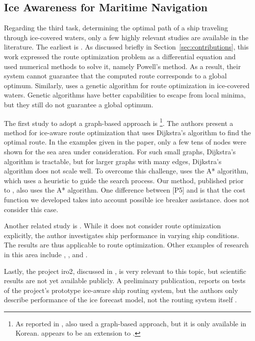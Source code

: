 \subsection{Ice Awareness for Maritime Navigation}
\label{sec:ice-awareness-literature}

Regarding the third task, determining the optimal path of a ship traveling through ice-covered waters, only a few highly relevant studies are available in the literature. The earliest is \cite{kotovirta2009system}. As discussed briefly in Section~\ref{sec:contributions}, this work expressed the route optimization problem as a differential equation and used numerical methods to solve it, namely Powell's method. As a result, their system cannot guarantee that the computed route corresponds to a global optimum. Similarly, \cite{choi2013application} uses a genetic algorithm for route optimization in ice-covered waters. Genetic algorithms have better capabilities to escape from local minima, but they still do not guarantee a global optimum. 

The first study to adopt a graph-based approach is \cite{nam2013simulation}\footnote{As reported in \cite{choi2013application}, \cite{Park2011} also used a graph-based approach, but it is only available in Korean. \cite{nam2013simulation} appears to be an extension to \cite{Park2011}.}. The authors present a method for ice-aware route optimization that uses Dijkstra's algorithm to find the optimal route. In the examples given in the paper, only a few tens of nodes were shown for the sea area under consideration. For such small graphs, Dijkstra's algorithm is tractable, but for larger graphs with many edges, Dijkstra's algorithm does not scale well. To overcome this challenge, \cite{choi2015arctic} uses the A* algorithm, which uses a heuristic to guide the search process. Our method, published prior to \cite{choi2015arctic}, also uses the A* algorithm. One difference between [P5] and \cite{choi2015arctic} is that the cost function we developed takes into account possible ice breaker assistance. \cite{choi2015arctic} does not consider this case.

Another related study is \cite{esa2015fuel}. While it does not consider route optimization explicitly, the author investigates ship performance in varying ship conditions. The results are thus applicable to route optimization. Other examples of research in this area include \cite{montewka2015towards}, \cite{laprairie1995transit}, and \cite{valanto2001resistance}.

Lastly, the project \gls{iro2}, discussed in \cite{fock2012}, is very relevant to this topic, but scientific results are not yet available publicly. A preliminary publication, reports on tests of the project's prototype ice-aware ship routing system, but the authors only describe performance of the ice forecast model, not the routing system itself \cite{dobrynin2015prediction}.



